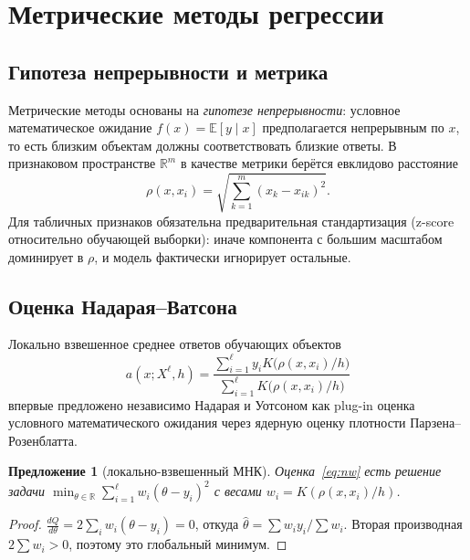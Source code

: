\documentclass[12pt,a4paper]{article}
\newtheorem{proposition}{Предложение}
\theoremstyle{definition}
\theoremstyle{remark}
\newcommand{\R}{\mathbb{R}}
\newcommand{\E}{\mathbb{E}}
\begin{document}
\section{Метрические методы регрессии}
\label{sec:metric}

\subsection{Гипотеза непрерывности и метрика}

Метрические методы основаны на \emph{гипотезе непрерывности}: условное
математическое ожидание $f(x)=\E[y\mid x]$ предполагается непрерывным по $x$,
то есть близким объектам должны соответствовать близкие ответы. В признаковом
пространстве $\R^{m}$ в качестве метрики берётся евклидово расстояние
\[
    \rho(x,x_{i})=\sqrt{\textstyle\sum_{k=1}^{m}(x_{k}-x_{ik})^{2}}.
\]
Для табличных признаков обязательна предварительная стандартизация (z-score
относительно обучающей выборки): иначе компонента с большим масштабом
доминирует в $\rho$, и модель фактически игнорирует остальные.

\subsection{Оценка Надарая--Ватсона}

Локально взвешенное среднее ответов обучающих объектов
\begin{equation}
    a(x;X^{\ell},h)=
    \frac{\sum_{i=1}^{\ell}y_{i}K\!\bigl(\rho(x,x_{i})/h\bigr)}
         {\sum_{i=1}^{\ell}K\!\bigl(\rho(x,x_{i})/h\bigr)}
    \label{eq:nw}
\end{equation}
впервые предложено независимо Надарая и Уотсоном как plug-in оценка условного
математического ожидания через ядерную оценку плотности Парзена--Розенблатта.

\begin{proposition}[локально-взвешенный МНК]
Оценка~\eqref{eq:nw} есть решение задачи
$\min_{\theta\in\R}\sum_{i=1}^{\ell}w_{i}(\theta-y_{i})^{2}$
с весами $w_{i}=K(\rho(x,x_{i})/h)$.
\end{proposition}

\begin{proof}
$\frac{dQ}{d\theta}=2\sum_{i}w_{i}(\theta-y_{i})=0$, откуда
$\hat\theta=\sum w_{i}y_{i}/\sum w_{i}$. Вторая производная
$2\sum w_{i}>0$, поэтому это глобальный минимум.
\end{proof}
\end{document}
